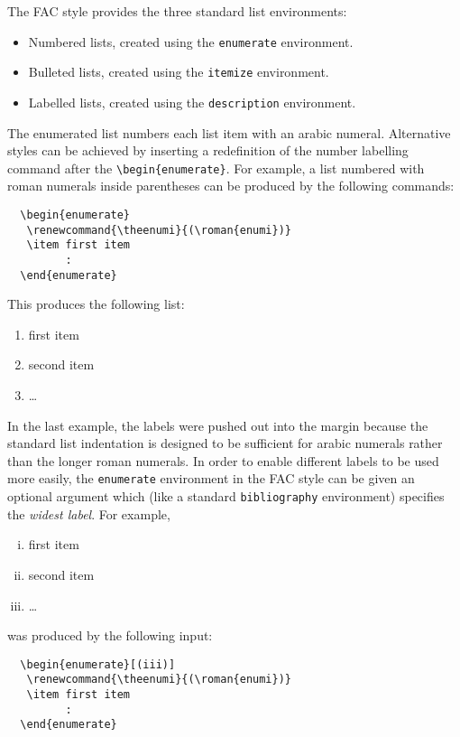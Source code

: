 The FAC style provides the three standard list environments:
\begin{itemize}
  \item Numbered lists, created using the \verb"enumerate" environment.
  \item Bulleted lists, created using the \verb"itemize" environment.
  \item Labelled lists, created using the \verb"description" environment.
\end{itemize}
The enumerated list numbers each list item with an arabic numeral.
Alternative styles can be achieved by inserting a redefinition of the
number labelling command after the \verb"\begin{enumerate}".
For example, a list numbered with roman numerals inside parentheses can be
produced by the following commands:
%
\begin{verbatim}
  \begin{enumerate}
   \renewcommand{\theenumi}{(\roman{enumi})}
   \item first item
         :
  \end{enumerate}
\end{verbatim}
%
This produces the following list:
%
\begin{enumerate}
  \renewcommand{\theenumi}{(\roman{enumi})}
  \item first item
  \item second item
  \item \etc\ldots
\end{enumerate}
%
In the last example, the labels were pushed out into the margin  because
the standard list indentation is designed to be sufficient for arabic
numerals rather than the longer roman numerals. In order to enable
different labels to be used more easily, the \verb"enumerate" environment
in the FAC style can be given an optional argument which (like a standard
\verb"bibliography" environment) specifies the {\em widest label}. For
example,
%
\begin{enumerate}[(iii)]
\renewcommand{\theenumi}{(\roman{enumi})}
  \item first item
  \item second item
  \item \etc\ldots
\end{enumerate}
%
was produced by the following input:
%
\begin{verbatim}
  \begin{enumerate}[(iii)]
   \renewcommand{\theenumi}{(\roman{enumi})}
   \item first item
         :
  \end{enumerate}
\end{verbatim}


